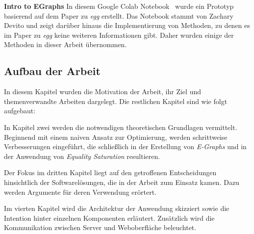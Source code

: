 \noindent\textbf{Intro to EGraphs} In diesem Google Colab Notebook~\cite{devito} wurde ein Prototyp basierend auf dem Paper zu \textit{egg} erstellt.
Das Notebook stammt von Zachary Devito und zeigt darüber hinaus die Implementierung von Methoden, zu denen es im Paper zu \textit{egg} keine weiteren Informationen gibt. 
Daher wurden einige der Methoden in dieser Arbeit übernommen.

\subsection{Aufbau der Arbeit}

In diesem Kapitel wurden die Motivation der Arbeit, ihr Ziel und themenverwandte Arbeiten dargelegt. Die restlichen Kapitel sind wie folgt aufgebaut:

\vspace{-2mm}

In Kapitel zwei werden die notwendigen theoretischen Grundlagen vermittelt. Beginnend mit einem naiven Ansatz zur Optimierung, werden schrittweise Verbesserungen
eingeführt, die schließlich in der Erstellung von \textit{E-Graphs} und in der Anwendung von \textit{Equality Saturation} resultieren. 

\vspace{6mm}

\vspace{-2mm}

Der Fokus im dritten Kapitel liegt auf den getroffenen Entscheidungen hinsichtlich der Softwarelösungen, die in der Arbeit zum Einsatz kamen. Dazu werden Argumente für deren Verwendung erörtert.

\vspace{6mm}

\vspace{-2mm}

Im vierten Kapitel wird die Architektur der Anwendung skizziert sowie die Intention hinter einzelnen Komponenten erläutert. Zusätzlich wird die Kommunikation zwischen 
Server und Weboberfläche beleuchtet. 

\vspace{6mm}

\vspace{-2mm}

